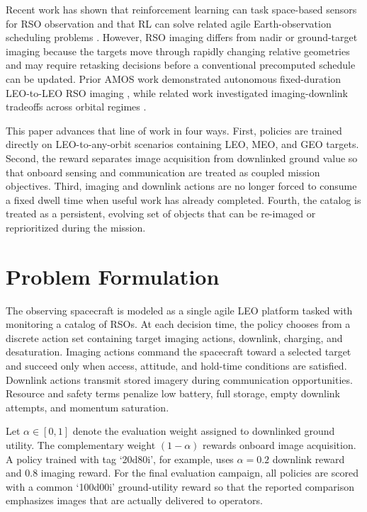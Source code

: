\documentclass{amos}
\begin{document}
Recent work has shown that reinforcement learning can task space-based sensors for RSO observation \cite{siew2022spaceBased} and that RL can solve related agile Earth-observation scheduling problems \cite{stephenson2024eventBased,mantovani2026cloud}. However, RSO imaging differs from nadir or ground-target imaging because the targets move through rapidly changing relative geometries and may require retasking decisions before a conventional precomputed schedule can be updated. Prior AMOS work demonstrated autonomous fixed-duration LEO-to-LEO RSO imaging \cite{hutererPrats2025amos}, while related work investigated imaging-downlink tradeoffs across orbital regimes \cite{hutererPrats2026aas}.

This paper advances that line of work in four ways. First, policies are trained directly on LEO-to-any-orbit scenarios containing LEO, MEO, and GEO targets. Second, the reward separates image acquisition from downlinked ground value so that onboard sensing and communication are treated as coupled mission objectives. Third, imaging and downlink actions are no longer forced to consume a fixed dwell time when useful work has already completed. Fourth, the catalog is treated as a persistent, evolving set of objects that can be re-imaged or reprioritized during the mission.

\section{Problem Formulation}

The observing spacecraft is modeled as a single agile LEO platform tasked with monitoring a catalog of RSOs. At each decision time, the policy chooses from a discrete action set containing target imaging actions, downlink, charging, and desaturation. Imaging actions command the spacecraft toward a selected target and succeed only when access, attitude, and hold-time conditions are satisfied. Downlink actions transmit stored imagery during communication opportunities. Resource and safety terms penalize low battery, full storage, empty downlink attempts, and momentum saturation.

Let $\alpha \in [0,1]$ denote the evaluation weight assigned to downlinked ground utility. The complementary weight $(1-\alpha)$ rewards onboard image acquisition. A policy trained with tag `20d80i', for example, uses $\alpha=0.2$ downlink reward and $0.8$ imaging reward. For the final evaluation campaign, all policies are scored with a common `100d00i' ground-utility reward so that the reported comparison emphasizes images that are actually delivered to operators.
\end{document}
